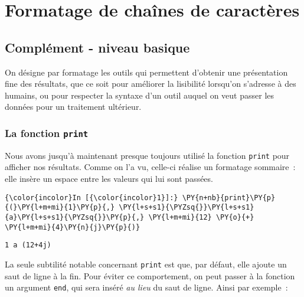     
    
    
    

    

    \hypertarget{formatage-de-chauxeenes-de-caractuxe8res}{%
\section{Formatage de chaînes de
caractères}\label{formatage-de-chauxeenes-de-caractuxe8res}}

    \hypertarget{compluxe9ment---niveau-basique}{%
\subsection{Complément - niveau
basique}\label{compluxe9ment---niveau-basique}}

    On désigne par formatage les outils qui permettent d'obtenir une
présentation fine des résultats, que ce soit pour améliorer la
lisibilité lorsqu'on s'adresse à des humains, ou pour respecter la
syntaxe d'un outil auquel on veut passer les données pour un traitement
ultérieur.

    \hypertarget{la-fonction-print}{%
\subsubsection{\texorpdfstring{La fonction
\texttt{print}}{La fonction print}}\label{la-fonction-print}}

    Nous avons jusqu'à maintenant presque toujours utilisé la fonction
\texttt{print} pour afficher nos résultats. Comme on l'a vu, celle-ci
réalise un formatage sommaire~: elle insère un espace entre les valeurs
qui lui sont passées.

    \begin{Verbatim}[commandchars=\\\{\}]
{\color{incolor}In [{\color{incolor}1}]:} \PY{n+nb}{print}\PY{p}{(}\PY{l+m+mi}{1}\PY{p}{,} \PY{l+s+s1}{\PYZsq{}}\PY{l+s+s1}{a}\PY{l+s+s1}{\PYZsq{}}\PY{p}{,} \PY{l+m+mi}{12} \PY{o}{+} \PY{l+m+mi}{4}\PY{n}{j}\PY{p}{)}
\end{Verbatim}


    \begin{Verbatim}[commandchars=\\\{\}]
1 a (12+4j)

    \end{Verbatim}

    La seule subtilité notable concernant \texttt{print} est que, par
défaut, elle ajoute un saut de ligne à la fin. Pour éviter ce
comportement, on peut passer à la fonction un argument \texttt{end}, qui
sera inséré \emph{au lieu} du saut de ligne. Ainsi par exemple~:

